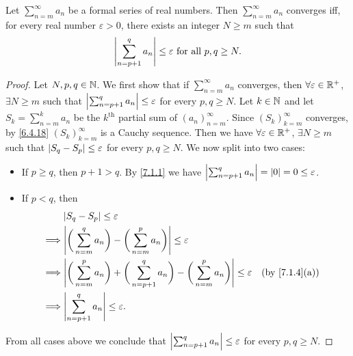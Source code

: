 \setcounter{thm}{4}
\begin{prop}\label{7.2.5}
  Let \(\sum_{n = m}^\infty a_n\) be a formal series of real numbers.
  Then \(\sum_{n = m}^\infty a_n\) converges iff, for every real number \(\varepsilon > 0\), there exists an integer \(N \geq m\) such that
  \[
    \left\lvert\sum_{n = p + 1}^q a_n\right\rvert \leq \varepsilon \text{ for all } p, q \geq N.
  \]
\end{prop}

\begin{proof}
  Let \(N, p, q \in \mathbb{N}\).
  We first show that if \(\sum_{n = m}^\infty a_n\) converges, then \(\forall \varepsilon \in \mathbb{R}^+\), \(\exists N \geq m\) such that \(\left\lvert\sum_{n = p + 1}^q a_n\right\rvert \leq \varepsilon\) for every \(p, q \geq N\).
  Let \(k \in \mathbb{N}\) and let \(S_k = \sum_{n = m}^k a_n\) be the \(k^{\text{th}}\) partial sum of \((a_n)_{n = m}^\infty\).
  Since \((S_k)_{k = m}^\infty\) converges, by \cref{6.4.18} \((S_k)_{k = m}^\infty\) is a Cauchy sequence.
  Then we have \(\forall \varepsilon \in \mathbb{R}^+\), \(\exists N \geq m\) such that \(\left\lvert S_q - S_p\right\rvert \leq \varepsilon\) for every \(p, q \geq N\).
  We now split into two cases:
  \begin{itemize}
    \item If \(p \geq q\), then \(p + 1 > q\).
          By \cref{7.1.1} we have \(\left\lvert\sum_{n = p + 1}^q a_n\right\rvert = \left\lvert0\right\rvert = 0 \leq \varepsilon\).
    \item If \(p < q\), then
          \begin{align*}
                     & \abs{S_q - S_p} \leq \varepsilon                                                                                                                             \\
            \implies & \abs{\bigg(\sum_{n = m}^q a_n\bigg) - \bigg(\sum_{n = m}^p a_n\bigg)} \leq \varepsilon                                                                       \\
            \implies & \abs{\bigg(\sum_{n = m}^p a_n\bigg) + \bigg(\sum_{n = p + 1}^q a_n\bigg) - \bigg(\sum_{n = m}^p a_n\bigg)} \leq \varepsilon &  & \text{(by \cref{7.1.4}(a))} \\
            \implies & \abs{\sum_{n = p + 1}^q a_n} \leq \varepsilon.
          \end{align*}
  \end{itemize}
  From all cases above we conclude that \(\left\lvert\sum_{n = p + 1}^q a_n\right\rvert \leq \varepsilon\) for every \(p, q \geq N\).


\end{proof}
